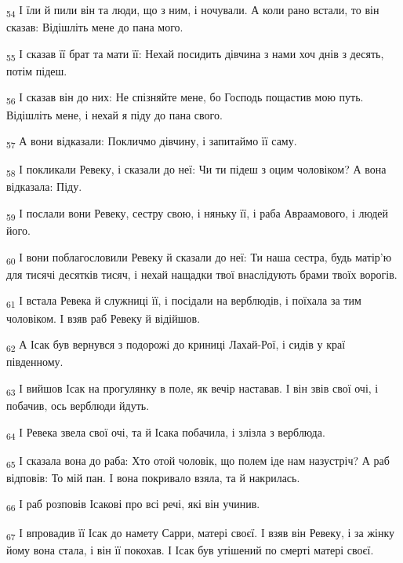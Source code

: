 \begin{tcolorbox}
\textsubscript{54} І їли й пили він та люди, що з ним, і ночували. А коли рано встали, то він сказав: Відішліть мене до пана мого.
\end{tcolorbox}
\begin{tcolorbox}
\textsubscript{55} І сказав її брат та мати її: Нехай посидить дівчина з нами хоч днів з десять, потім підеш.
\end{tcolorbox}
\begin{tcolorbox}
\textsubscript{56} І сказав він до них: Не спізняйте мене, бо Господь пощастив мою путь. Відішліть мене, і нехай я піду до пана свого.
\end{tcolorbox}
\begin{tcolorbox}
\textsubscript{57} А вони відказали: Покличмо дівчину, і запитаймо її саму.
\end{tcolorbox}
\begin{tcolorbox}
\textsubscript{58} І покликали Ревеку, і сказали до неї: Чи ти підеш з оцим чоловіком? А вона відказала: Піду.
\end{tcolorbox}
\begin{tcolorbox}
\textsubscript{59} І послали вони Ревеку, сестру свою, і няньку її, і раба Авраамового, і людей його.
\end{tcolorbox}
\begin{tcolorbox}
\textsubscript{60} І вони поблагословили Ревеку й сказали до неї: Ти наша сестра, будь матір'ю для тисячі десятків тисяч, і нехай нащадки твої внаслідують брами твоїх ворогів.
\end{tcolorbox}
\begin{tcolorbox}
\textsubscript{61} І встала Ревека й служниці її, і посідали на верблюдів, і поїхала за тим чоловіком. І взяв раб Ревеку й відійшов.
\end{tcolorbox}
\begin{tcolorbox}
\textsubscript{62} А Ісак був вернувся з подорожі до криниці Лахай-Рої, і сидів у краї південному.
\end{tcolorbox}
\begin{tcolorbox}
\textsubscript{63} І вийшов Ісак на прогулянку в поле, як вечір наставав. І він звів свої очі, і побачив, ось верблюди йдуть.
\end{tcolorbox}
\begin{tcolorbox}
\textsubscript{64} І Ревека звела свої очі, та й Ісака побачила, і злізла з верблюда.
\end{tcolorbox}
\begin{tcolorbox}
\textsubscript{65} І сказала вона до раба: Хто отой чоловік, що полем іде нам назустріч? А раб відповів: То мій пан. І вона покривало взяла, та й накрилась.
\end{tcolorbox}
\begin{tcolorbox}
\textsubscript{66} І раб розповів Ісакові про всі речі, які він учинив.
\end{tcolorbox}
\begin{tcolorbox}
\textsubscript{67} І впровадив її Ісак до намету Сарри, матері своєї. І взяв він Ревеку, і за жінку йому вона стала, і він її покохав. І Ісак був утішений по смерті матері своєї.
\end{tcolorbox}
